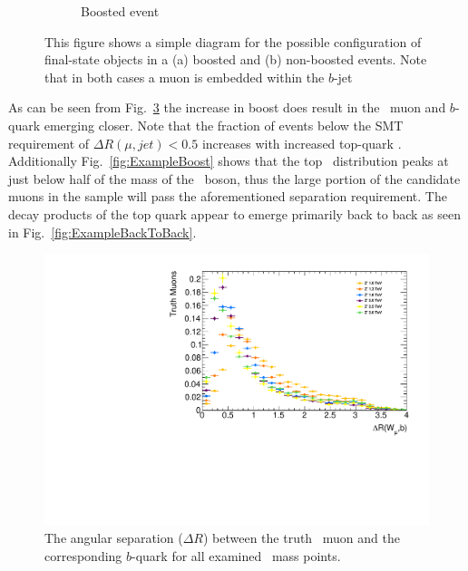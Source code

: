 \begin{figure}[t]
\begin{subfigure}[b]{0.45\textwidth}
    \caption{Boosted event} \label{fig:BoostedDiagram}
  \end{subfigure}
  \caption{This figure shows a simple diagram for the possible configuration of final-state objects in a (a) boosted and (b) non-boosted events. Note that in both cases a muon is embedded within the $b$-jet} \label{fig:SimpleAngularDiagrams}

\end{figure}

As can be seen from Fig.~\ref{fig:ExampleCollimation} the increase in boost does result in the \W\ muon and $b$-quark emerging closer. Note that the fraction of events below the SMT requirement of $\Delta R(\mu,jet)<0.5$ increases with increased top-quark \pt. Additionally Fig.~\ref{fig:ExampleBoost} shows that the top \pt\ distribution peaks at just below half of the mass of the \Zprime\ boson, thus the large portion of the candidate muons in the sample will pass the aforementioned separation requirement. The decay products of the top quark appear to emerge primarily back to back as seen in Fig.~\ref{fig:ExampleBackToBack}.

\begin{figure}[t]
\includegraphics[width=\textwidth]{PartBoosted/Plots/h_trmu_b_dr.pdf}
\caption{The angular separation ($\Delta R$) between the truth \W\ muon and the corresponding $b$-quark for all examined \Zprime\ mass points.} \label{fig:ExampleCollimation}
\end{figure}

